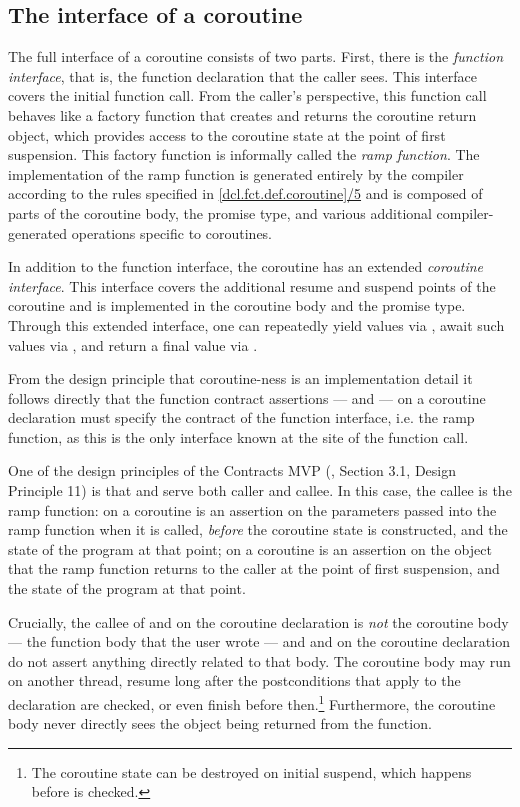 \subsection{The interface of a coroutine}

The full interface of a coroutine consists of two parts. First, there is the \emph{function interface}, that is, the function declaration that the caller sees. This interface covers the initial function call. From the caller's perspective, this function call behaves like a factory function that creates and returns the coroutine return object, which provides access to the coroutine state at the point of first suspension. This factory function is informally called the \emph{ramp function}. The implementation of the ramp function is generated entirely by the compiler according to the rules specified in \href{https://eel.is/c++draft/dcl.fct.def.coroutine#5}{[dcl.fct.def.coroutine]/5} and is composed of parts of the coroutine body, the promise type, and various additional compiler-generated operations specific to coroutines.

In addition to the function interface, the coroutine has an extended \emph{coroutine interface}. This interface covers the additional resume and suspend points of the coroutine and is implemented in the coroutine body and the promise type.  Through this extended interface, one can repeatedly yield values via , await such values via , and return a final value via .

From the design principle that coroutine-ness is an implementation detail it follows directly that the function contract assertions ---  and  --- on a coroutine declaration must specify the contract of the function interface, i.e. the ramp function, as this is the only interface known at the site of the function call.

One of the design principles of the Contracts MVP (\cite{P2900R8}, Section 3.1, Design Principle 11) is that  and  serve both caller and callee. In this case, the callee is the ramp function:  on a coroutine is an assertion on the parameters passed into the ramp function when it is called, \emph{before} the coroutine state is constructed, and the state of the program at that point;  on a coroutine is an assertion on the object that the ramp function returns to the caller at the point of first suspension, and the state of the program at that point.

Crucially, the callee of  and  on the coroutine declaration is \emph{not} the coroutine body --- the function body that the user wrote --- and  and  on the coroutine declaration do not assert anything directly related to that body. The coroutine body may run on another thread, resume long after the postconditions that apply to the declaration are checked, or even finish before then.\footnote{The coroutine state can be destroyed on initial suspend, which happens before  is checked.} Furthermore, the coroutine body never directly sees the object being returned from the function.

